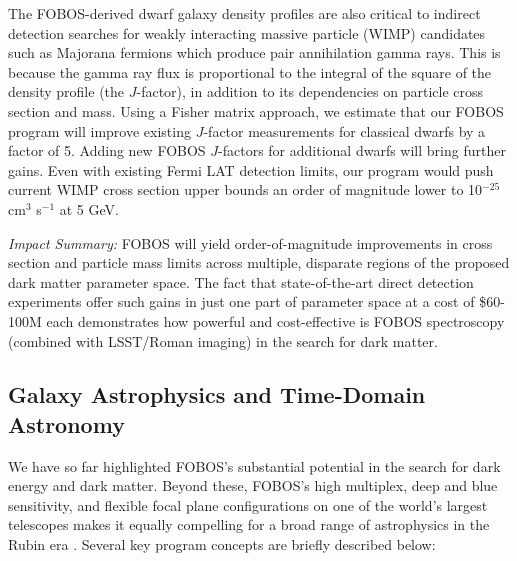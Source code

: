 \documentclass[oneside,11pt]{amsart}
\begin{document}
The FOBOS-derived dwarf galaxy density profiles are also critical to indirect detection searches for weakly interacting massive particle (WIMP) candidates such as Majorana fermions which produce pair annihilation gamma rays.  This is because the gamma ray flux is proportional to the integral of the square of the density profile (the $J$-factor), in addition to its dependencies on particle cross section and mass.  Using a Fisher matrix approach, we estimate that our FOBOS program will improve existing $J$-factor measurements for classical dwarfs by a factor of 5.  Adding new FOBOS $J$-factors for additional dwarfs will bring further gains.  Even with existing Fermi LAT detection limits, our program would push current WIMP cross section upper bounds an order of magnitude lower to 10$^{-25}$ cm$^3$ s$^{-1}$ at 5 GeV.

\medskip
\noindent \emph{Impact Summary:} FOBOS will yield order-of-magnitude improvements in cross section and particle mass limits across multiple, disparate regions of the proposed dark matter parameter space.  The fact that state-of-the-art direct detection experiments offer such gains in just one part of parameter space at a cost of \$60-100M each demonstrates how powerful and cost-effective is FOBOS spectroscopy (combined with LSST/Roman imaging) in the search for dark matter.



 


\subsection{Galaxy Astrophysics and Time-Domain Astronomy}

We have so far highlighted FOBOS's substantial potential in the search for dark energy and dark matter.  Beyond these, FOBOS's high multiplex, deep and blue sensitivity, and flexible focal plane configurations on one of the world's largest telescopes makes it equally compelling for a broad range of astrophysics in the Rubin era \citep[see][]{bundy19}.  Several key program concepts are briefly described below:
\end{document}

